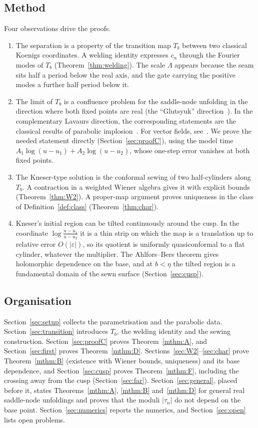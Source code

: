 \documentclass[11pt]{amsart}
\theoremstyle{definition}
\begin{document}
\subsection*{Method}
Four observations drive the proofs.
\begin{enumerate}
\item The separation is a property of the transition map $T_b$ between two
  classical Koenigs coordinates.  A welding identity expresses $c_n$ through
  the Fourier modes of $T_b$ (Theorem~\ref{thm:welding}).  The scale $\Lambda$
  appears because the seam sits half a period below the real axis, and the
  gate carrying the positive modes a further half period below it.
\item The limit of $T_b$ is a confluence problem for the saddle-node unfolding
  in the direction where both fixed points are real (the ``Glutsyuk''
  direction~\cite{Glutsyuk2001,MRR2004,ChristopherRousseau}).  In the
complementary Lavaurs direction, the corresponding statements are the classical
results of parabolic implosion~\cite{Lavaurs1989,Shishikura2000,Oudkerk1999}.
For vector fields, see~\cite{RousseauTeyssier2008}.  We prove the
  needed statement directly (Section~\ref{sec:proofC}), using the model time
  $A_1\log(u-u_1)+A_2\log(u-u_2)$, whose one-step error vanishes at both fixed
  points.
\item The Kneser-type solution is the conformal sewing of two half-cylinders
  along $T_b$.  A contraction in a weighted Wiener algebra gives it with
  explicit bounds (Theorem~\ref{thm:W2}).  A proper-map argument proves
  uniqueness in the class of Definition~\ref{def:class}
  (Theorem~\ref{thm:char}).
\item Kneser's initial region can be tilted continuously around the cusp.
  In the coordinate $\log\frac{u-u_1}{u-u_2}$ it is a thin strip on which the map is a
  translation up to relative error $O(|\varepsilon|)$, so its quotient is uniformly
  quasiconformal to a flat cylinder, whatever the multiplier.  The
  Ahlfors--Bers theorem gives holomorphic dependence on the base, and at
  $b<\eta$ the tilted region is a fundamental domain of the sewn surface
  (Section~\ref{sec:cusp}).
\end{enumerate}

\subsection*{Organisation}
Section~\ref{sec:setup} collects the parametrisation and the parabolic data.
Section~\ref{sec:transition} introduces $T_b$, the welding identity and the
sewing construction.  Section~\ref{sec:proofC} proves Theorem~\ref{mthm:A}, and
Section~\ref{sec:first} proves Theorem~\ref{mthm:D}.
Sections~\ref{sec:W2}--\ref{sec:char} prove Theorem~\ref{mthm:B} (existence
with Wiener bounds, uniqueness) and its base dependence, and Section~\ref{sec:cusp}
proves Theorem~\ref{mthm:F}, including the crossing away from the cusp
(Section~\ref{sec:far}).  Section~\ref{sec:general}, placed before it, states
Theorems~\ref{mthm:A}, \ref{mthm:B} and~\ref{mthm:D} for general real saddle-node
unfoldings and proves that the moduli $|\tau_n|$ do not depend on the base point.
Section~\ref{sec:numerics} reports the numerics, and
Section~\ref{sec:open} lists open problems.
\end{document}
